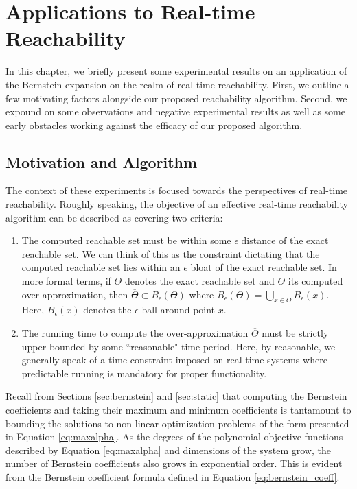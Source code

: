 \newcommand{\barb}{\overline{b}}

\newcommand{\ComputeBern}{\texttt{ComputeBernsteinCoeffIntervals}}
\newcommand{\FindOverlaps}{\texttt{FindOverlapsWithGrid}}
\newcommand{\ComputeGridRep}{\texttt{ComputeGridGeneratorRep}}



\chapter{Applications to Real-time Reachability}
%
In this chapter, we briefly present some experimental results on an application of the Bernstein expansion on the realm of real-time reachability. First, we outline a few motivating factors alongside our proposed reachability algorithm. Second, we expound on some observations and negative experimental results as well as some early obstacles working against the efficacy of our proposed algorithm.
%
\section{Motivation and Algorithm}
The context of these experiments is focused towards the perspectives of real-time reachability. Roughly speaking, the objective of an effective real-time reachability algorithm can be described as covering two criteria:
%
\begin{enumerate}
  \item The computed reachable set must be within some $\epsilon$ distance of the exact reachable set. We can think of this as the constraint dictating that the computed reachable set lies within an $\epsilon$ bloat of the exact reachable set. In more formal terms, if $\Theta$ denotes the exact reachable set and $\overline{\Theta}$ its computed over-approximation, then
    $ \overline{\Theta} \subset B_\epsilon(\Theta)$
    where
    $B_\epsilon(\Theta) = \bigcup_{x \in \Theta} B_{\epsilon}(x)$. Here, $B_\epsilon(x)$ denotes the $\epsilon$-ball around point $x$.
  \item The running time to compute the over-approximation $\overline{\Theta}$ must be strictly upper-bounded by some ``reasonable" time period. Here, by reasonable, we generally speak of a time constraint imposed on real-time systems where predictable running is mandatory for proper functionality.
\end{enumerate}

\noindent Recall from Sections \ref{sec:bernstein} and \ref{sec:static} that computing the Bernstein coefficients and taking their maximum and minimum coefficients is tantamount to bounding the solutions to non-linear optimization problems of the form presented in Equation \ref{eq:maxalpha}. As the degrees of the polynomial objective functions described by Equation \ref{eq:maxalpha} and dimensions of the system grow, the number of Bernstein coefficients also grows in exponential order. This is evident from the Bernstein coefficient formula defined in Equation \ref{eq:bernstein_coeff}.


